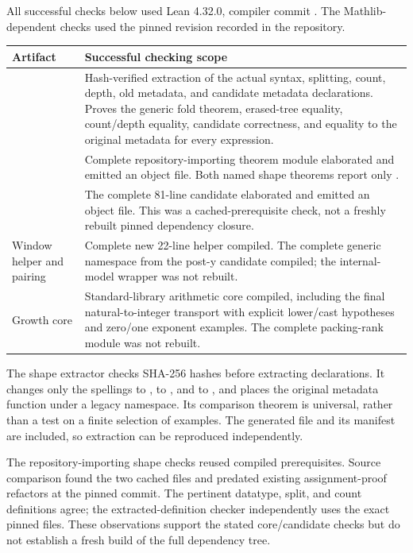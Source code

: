 {\raggedright All successful checks below used Lean 4.32.0, compiler commit
. The Mathlib-dependent checks used the pinned revision recorded in the repository.\par}

\begin{tabularx}{\textwidth}{@{}p{}Y@{}}
\toprule
Artifact & Successful checking scope\\
\midrule
{} & Hash-verified extraction of the actual syntax, splitting, count, depth, old metadata, and candidate metadata declarations. Proves the generic fold theorem, erased-tree equality, count/depth equality, candidate correctness, and equality to the original metadata for every expression.\\
\addlinespace
{} & Complete repository-importing theorem module elaborated and emitted an object file. Both named shape theorems report only .\\
\addlinespace
{} & The complete 81-line candidate elaborated and emitted an object file. This was a cached-prerequisite check, not a freshly rebuilt pinned dependency closure.\\
\addlinespace
Window helper and pairing & Complete new 22-line helper compiled. The complete generic  namespace from the post-y candidate compiled; the internal-model wrapper was not rebuilt.\\
\addlinespace
Growth core & Standard-library arithmetic core compiled, including the final natural-to-integer transport with explicit lower/cast hypotheses and zero/one exponent examples. The complete packing-rank module was not rebuilt.\\
\bottomrule
\end{tabularx}

The shape extractor checks SHA-256 hashes before extracting declarations. It changes only the spellings  to ,  to , and  to , and places the original metadata function under a legacy namespace. Its comparison theorem is universal, rather than a test on a finite selection of examples. The generated file and its manifest are included, so extraction can be reproduced independently.

The repository-importing shape checks reused compiled prerequisites. Source comparison found the two cached files  and  predated existing assignment-proof refactors at the pinned commit. The pertinent datatype, split, and count definitions agree; the extracted-definition checker independently uses the exact pinned files. These observations support the stated core/candidate checks but do not establish a fresh build of the full dependency tree.

